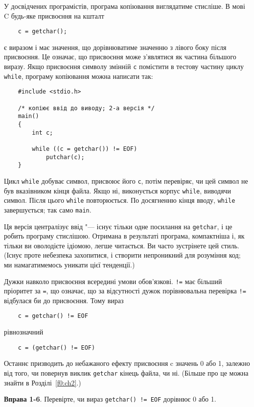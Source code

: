 \documentclass[a4paper,12pt]{book}
\begin{document}
  У досвідчених програмістів, програма копіювання виглядатиме стисліше. В мові C будь-яке
  присвоєння на кшталт
  \begin{verbatim}
    c = getchar();
  \end{verbatim}
  є виразом і має значення, що дорівнюватиме значенню з лівого боку після присвоєння. Це
  означає, що присвоєння може з'являтися як частина більшого виразу. Якщо присвоєння
  символу змінній \texttt{c} помістити в тестову частину циклу \texttt{while}, програму
  копіювання можна написати так:
  \begin{verbatim}
    #include <stdio.h>

    /* копіює ввід до виводу; 2-а версія */
    main()
    {
        int c;

        while ((c = getchar()) != EOF)
            putchar(c);
    }
  \end{verbatim}

  Цикл \texttt{while} добуває символ, присвоює його \texttt{c}, потім перевіряє, чи цей
  символ не був вказівником кінця файла. Якщо ні, виконується корпус \texttt{while},
  виводячи символ. Після цього \texttt{while} повторюється. По досягненню кінця вводу,
  \texttt{while} завершується; так само \texttt{main}.

  Ця версія централізує ввід "--- існує тільки одне посилання на \texttt{getchar}, і це
  робить програму стислішою. Отримана в результаті програма, компактніша і, як тільки ви
  оволодієте ідіомою, легше читається. Ви часто зустрінете цей стиль. (Існує проте
  небезпека захопитися, і створити непроникний для розуміння код; ми намагатимемось
  уникати цієї тенденції.)

  Дужки навколо присвоєння всередині умови обов'язкові. \texttt{!=} має більший пріоритет
  за \texttt{=}, що означає, що за відсутності дужок порівнювальна перевірка \texttt{!=}
  відбулася би до присвоєння. Тому вираз
  \begin{verbatim}
    c = getchar() != EOF
  \end{verbatim}
  рівнозначний
  \begin{verbatim}
    c = (getchar() != EOF)
  \end{verbatim}

  Останнє призводить до небажаного ефекту присвоєння c значень 0 або 1, залежно від того,
  чи повернув виклик \texttt{getchar} кінець файла, чи ні. (Більше про це можна знайти в
  Розділі~\ref{f0:ch2}.)

  \textbf{Вправа 1-6}. Перевірте, чи вираз \texttt{getchar() != EOF} дорівнює 0 або 1.
\end{document}
